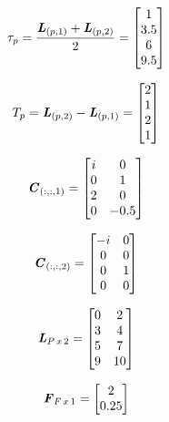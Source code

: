 \documentclass[10pt]{report}
\begin{document}
\begin{equation*}
	\tau_p = \frac{\bm{\mathit{L}}_{(p, 1)} + \bm{\mathit{L}}_{(p, 2)}}{2} = 
	\begin{bmatrix}
		1 \\
		3.5 \\
		6 \\
		9.5 \\
	\end{bmatrix}
\end{equation*}

\begin{equation*}
	T_p = \bm{\mathit{L}}_{(p, 2)} - \bm{\mathit{L}}_{(p, 1)} =
	\begin{bmatrix}
		2 \\
		1 \\
		2 \\
		1 \\
	\end{bmatrix}
\end{equation*}


\begin{equation*}
	\bm{\mathit{C}}_{(:, :, 1)} = 
	\begin{bmatrix}
		i & 0 \\
		0 & 1 \\
		2 & 0 \\
		0 & -0.5 \\
	\end{bmatrix}
\end{equation*}

\begin{equation*}
	\bm{\mathit{C}}_{(:, :, 2)} = 
	\begin{bmatrix}
		-i & 0 \\
		0 & 0 \\
		0 & 1 \\
		0 & 0 \\
	\end{bmatrix}
\end{equation*}


\begin{equation*}
	\bm{\mathit{L}}_{P \, x \, 2} = 
	\begin{bmatrix}
		0 & 2 \\
		3 & 4 \\
		5 & 7 \\
		9 & 10 \\
	\end{bmatrix}
\end{equation*}

\begin{equation*}
	\bm{\mathit{F}}_{F \, x \, 1} = 
	\begin{bmatrix}
		2 \\
		0.25 \\
	\end{bmatrix}
\end{equation*}
\end{document}
